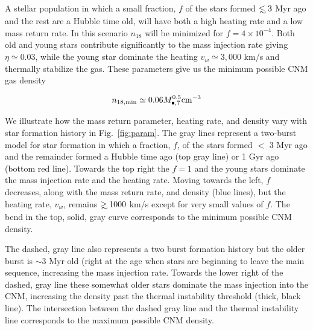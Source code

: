 \documentclass[usenatbib,fleqn]{mn2e}
\newcommand\lsim{\mathrel{\rlap{\lower4pt\hbox{\hskip1pt$\sim$}}
    \raise1pt\hbox{$<$}}}
\newcommand\gsim{\mathrel{\rlap{\lower4pt\hbox{\hskip1pt$\sim$}}
    \raise1pt\hbox{$>$}}}
\newcommand{\Mbh}[1][]{M_{\bullet#1}}
\begin{document}
A stellar population in which a small fraction, $f$ of the stars
formed $\lsim 3$ Myr ago and the rest are a Hubble time old, will have
both a high heating rate and a low mass return rate. In this scenario
$n_{18}$ will be minimized for $f=4\times 10^{-4}$. Both old and young
stars contribute significantly to the mass injection rate giving
$\eta\simeq 0.03$, while the young star dominate the heating
$v_w\simeq 3,000$ km/s and thermally stabilize the gas. These
parameters give us the minimum possible CNM gas density

\begin{equation}
n_{\rm 18,min}\simeq 0.06 \Mbh[,7]^{0.5} {\rm cm^{-3}}
\label{eq:n18min}
\end{equation}

We illustrate how the mass return parameter, heating rate, and
density vary with star formation history in Fig.~\ref{fig:param}. The
gray lines represent a two-burst model for star formation in which a
fraction, $f$, of the stars formed $<$ 3 Myr ago and the remainder
formed a Hubble time ago (top gray line) or 1 Gyr ago (bottom red
line).  Towards the top right the $f=1$ and the young stars dominate
the mass injection rate and the heating rate.  Moving towards the
left, $f$ decreases, along with the mass return rate, and density
(blue lines), but the heating rate, $v_w$, remains $\gsim 1000$ km/s
except for very small values of $f$. The bend in the top, solid, gray curve
corresponds to the minimum possible CNM density.

The dashed, gray line also represents a two burst formation history
but the older burst is $\sim 3$ Myr old (right at the age when stars
are beginning to leave the main sequence, increasing the mass
injection rate. Towards the lower right of the dashed, gray line these
somewhat older stars dominate the mass injection into the CNM,
increasing the density past the thermal instability threshold (thick,
black line). The intersection between the dashed gray line and the
thermal instability line corresponds to the maximum possible CNM
density.
\end{document}

